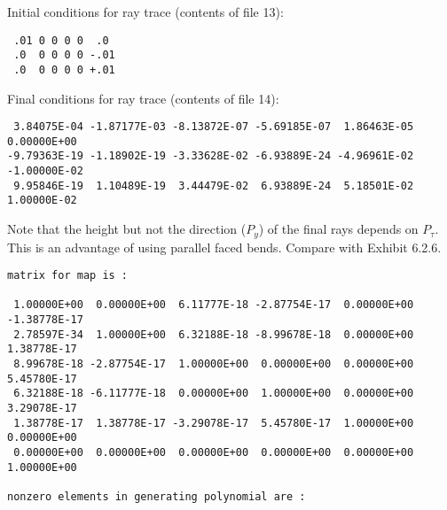 Initial conditions for ray trace (contents of file 13):
\begin{footnotesize}
\begin{verbatim}
 .01 0 0 0 0  .0
 .0  0 0 0 0 -.01
 .0  0 0 0 0 +.01
\end{verbatim}
\end{footnotesize}
Final conditions for ray trace (contents of file 14):
\begin{footnotesize}
\begin{verbatim}
 3.84075E-04 -1.87177E-03 -8.13872E-07 -5.69185E-07  1.86463E-05  0.00000E+00
-9.79363E-19 -1.18902E-19 -3.33628E-02 -6.93889E-24 -4.96961E-02 -1.00000E-02
 9.95846E-19  1.10489E-19  3.44479E-02  6.93889E-24  5.18501E-02  1.00000E-02
\end{verbatim}
\end{footnotesize}
Note that the height but not the direction ($P_y$) of the final rays
depends on $P_\tau$.  This is an advantage of using parallel faced bends.
Compare with Exhibit 6.2.6.
\begin{footnotesize}
\begin{verbatim}
matrix for map is :

 1.00000E+00  0.00000E+00  6.11777E-18 -2.87754E-17  0.00000E+00 -1.38778E-17
 2.78597E-34  1.00000E+00  6.32188E-18 -8.99678E-18  0.00000E+00  1.38778E-17
 8.99678E-18 -2.87754E-17  1.00000E+00  0.00000E+00  0.00000E+00  5.45780E-17
 6.32188E-18 -6.11777E-18  0.00000E+00  1.00000E+00  0.00000E+00  3.29078E-17
 1.38778E-17  1.38778E-17 -3.29078E-17  5.45780E-17  1.00000E+00  0.00000E+00
 0.00000E+00  0.00000E+00  0.00000E+00  0.00000E+00  0.00000E+00  1.00000E+00

nonzero elements in generating polynomial are :

\end{verbatim}
\end{footnotesize}

\newpage
